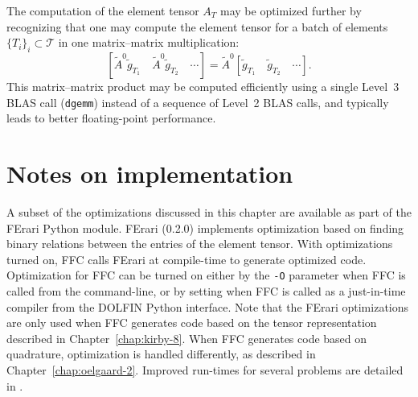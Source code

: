 The computation of the element tensor $A_T$ may be optimized further
by recognizing that one may compute the element tensor for a batch of
elements $\{T_i\}_i \subset \mathcal{T}$ in one matrix--matrix
multiplication:
\begin{equation}
  \left[\tilde{A}^0 \tilde{g}_{T_1} \quad \tilde{A}^0 \tilde{g}_{T_2} \quad \cdots \right] =
  \tilde{A}^0 \left[\tilde{g}_{T_1} \quad \tilde{g}_{T_2} \quad \cdots\right].
\end{equation}
This matrix--matrix product may be computed efficiently using a single
Level~3 BLAS call (\texttt{dgemm}) instead of a sequence of Level~2
BLAS calls, and typically leads to better floating-point
performance.

\section{Notes on implementation}

A subset of the optimizations discussed in this chapter are available
as part of the FErari Python module. FErari
(0.2.0) implements optimization based on finding binary relations
between the entries of the element tensor. With optimizations turned
on, FFC calls FErari at compile-time to generate optimized
code. Optimization for FFC can be turned on either by the \texttt{-O}
parameter when FFC is called from the command-line, or by setting
 when FFC is
called as a just-in-time compiler from the DOLFIN Python
interface. Note that the FErari optimizations are only used when FFC
generates code based on the tensor representation described in
Chapter~\ref{chap:kirby-8}. When FFC generates code based on
quadrature, optimization is handled differently, as described in
Chapter~\ref{chap:oelgaard-2}. Improved run-times for several
problems are detailed in \citet{KirbyLogg2008}.

